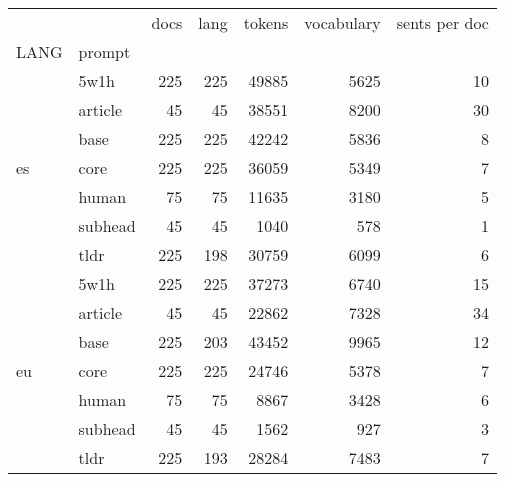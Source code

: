 \begin{tabular}{llrrrrr}
\toprule
 &  & docs & lang & tokens & vocabulary & sents per doc \\
LANG & prompt &  &  &  &  &  \\
\midrule
\multirow[t]{7}{*}{es} & 5w1h & 225 & 225 & 49885 & 5625 & 10 \\
 & article & 45 & 45 & 38551 & 8200 & 30 \\
 & base & 225 & 225 & 42242 & 5836 & 8 \\
 & core & 225 & 225 & 36059 & 5349 & 7 \\
 & human & 75 & 75 & 11635 & 3180 & 5 \\
 & subhead & 45 & 45 & 1040 & 578 & 1 \\
 & tldr & 225 & 198 & 30759 & 6099 & 6 \\
\cline{1-7}
\multirow[t]{7}{*}{eu} & 5w1h & 225 & 225 & 37273 & 6740 & 15 \\
 & article & 45 & 45 & 22862 & 7328 & 34 \\
 & base & 225 & 203 & 43452 & 9965 & 12 \\
 & core & 225 & 225 & 24746 & 5378 & 7 \\
 & human & 75 & 75 & 8867 & 3428 & 6 \\
 & subhead & 45 & 45 & 1562 & 927 & 3 \\
 & tldr & 225 & 193 & 28284 & 7483 & 7 \\
\cline{1-7}
\bottomrule
\end{tabular}
